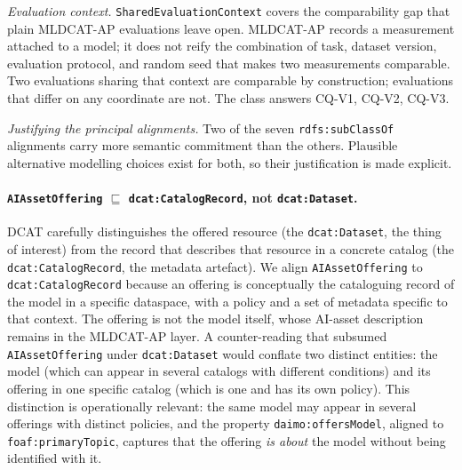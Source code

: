 \documentclass[11pt,a4paper]{article}
\newcommand{\code}[1]{\texttt{#1}}
\begin{document}
\medskip\noindent\emph{Evaluation context.}
\code{SharedEvaluationContext} covers the comparability gap that plain MLDCAT-AP evaluations leave open. MLDCAT-AP records a measurement attached to a model; it does not reify the combination of task, dataset version, evaluation protocol, and random seed that makes two measurements comparable. Two evaluations sharing that context are comparable by construction; evaluations that differ on any coordinate are not. The class answers CQ-V1, CQ-V2, CQ-V3.

\medskip\noindent\emph{Justifying the principal alignments.}\label{sec:alignment-defense}
Two of the seven \code{rdfs:subClassOf} alignments carry more semantic commitment than the others. Plausible alternative modelling choices exist for both, so their justification is made explicit.

\paragraph{\code{AIAssetOffering} $\sqsubseteq$ \code{dcat:CatalogRecord}, not \code{dcat:Dataset}.} DCAT carefully distinguishes the offered resource (the \code{dcat:Dataset}, the thing of interest) from the record that describes that resource in a concrete catalog (the \code{dcat:CatalogRecord}, the metadata artefact). We align \code{AIAssetOffering} to \code{dcat:CatalogRecord} because an offering is conceptually the cataloguing record of the model in a specific dataspace, with a policy and a set of metadata specific to that context. The offering is not the model itself, whose AI-asset description remains in the MLDCAT-AP layer. A counter-reading that subsumed \code{AIAssetOffering} under \code{dcat:Dataset} would conflate two distinct entities: the model (which can appear in several catalogs with different conditions) and its offering in one specific catalog (which is one and has its own policy). This distinction is operationally relevant: the same model may appear in several offerings with distinct policies, and the property \code{daimo:offersModel}, aligned to \code{foaf:primaryTopic}, captures that the offering \emph{is about} the model without being identified with it.
\end{document}
